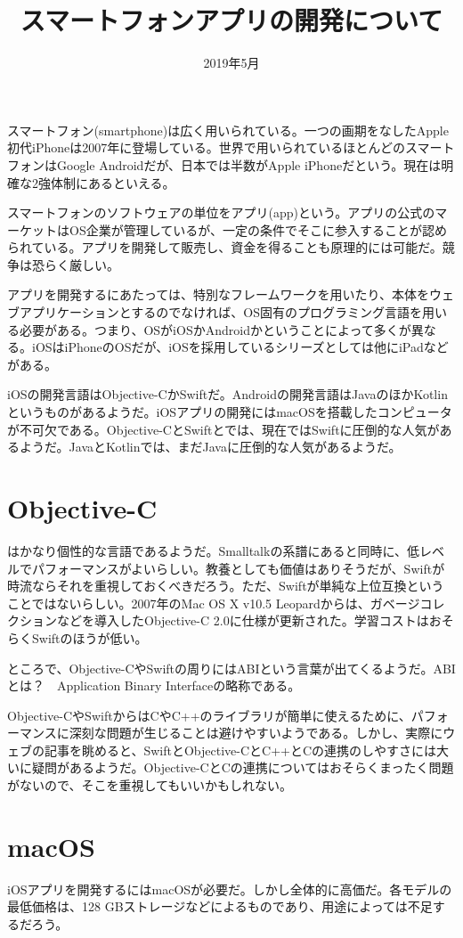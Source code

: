 \documentclass[uplatex,dvipdfmx]{jsarticle} \usepackage{amsmath,amssymb,bm}
\title{スマートフォンアプリの開発について} \author{} \date{2019年5月}
\begin{document}
\maketitle

スマートフォン(smartphone)は広く用いられている。一つの画期をなしたApple初代iPhoneは2007年に登場している。世界で用いられているほとんどのスマートフォンはGoogle Androidだが、日本では半数がApple iPhoneだという。現在は明確な2強体制にあるといえる。

スマートフォンのソフトウェアの単位をアプリ(app)という。アプリの公式のマーケットはOS企業が管理しているが、一定の条件でそこに参入することが認められている。アプリを開発して販売し、資金を得ることも原理的には可能だ。競争は恐らく厳しい。

アプリを開発するにあたっては、特別なフレームワークを用いたり、本体をウェブアプリケーションとするのでなければ、OS固有のプログラミング言語を用いる必要がある。つまり、OSがiOSかAndroidかということによって多くが異なる。iOSはiPhoneのOSだが、iOSを採用しているシリーズとしては他にiPadなどがある。

iOSの開発言語はObjective-CかSwiftだ。Androidの開発言語はJavaのほかKotlinというものがあるようだ。iOSアプリの開発にはmacOSを搭載したコンピュータが不可欠である。Objective-CとSwiftとでは、現在ではSwiftに圧倒的な人気があるようだ。JavaとKotlinでは、まだJavaに圧倒的な人気があるようだ。

\section*{Objective-C}
はかなり個性的な言語であるようだ。Smalltalkの系譜にあると同時に、低レベルでパフォーマンスがよいらしい。教養としても価値はありそうだが、Swiftが時流ならそれを重視しておくべきだろう。ただ、Swiftが単純な上位互換ということではないらしい。2007年のMac OS X v10.5 Leopardからは、ガベージコレクションなどを導入したObjective-C 2.0に仕様が更新された。学習コストはおそらくSwiftのほうが低い。

ところで、Objective-CやSwiftの周りにはABIという言葉が出てくるようだ。ABIとは？　Application Binary Interfaceの略称である。

Objective-CやSwiftからはCやC++のライブラリが簡単に使えるために、パフォーマンスに深刻な問題が生じることは避けやすいようである。しかし、実際にウェブの記事を眺めると、SwiftとObjective-CとC++とCの連携のしやすさには大いに疑問があるようだ。Objective-CとCの連携についてはおそらくまったく問題がないので、そこを重視してもいいかもしれない。

\section*{macOS}
iOSアプリを開発するにはmacOSが必要だ。しかし全体的に高価だ。各モデルの最低価格は、128 GBストレージなどによるものであり、用途によっては不足するだろう。
\end{document}
